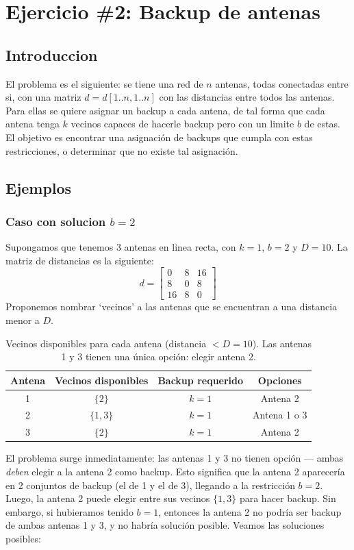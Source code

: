 \section{Ejercicio \#2: Backup de antenas}
\subsection{Introduccion}
El problema es el siguiente: se tiene una red de $n$ antenas, todas conectadas entre si, con una matriz $d = d[1..n, 1..n]$ con las distancias entre todos las antenas. Para ellas se quiere asignar un backup a cada antena, de tal forma que cada antena tenga $k$ vecinos capaces de hacerle backup pero con un limite $b$ de estas. El objetivo es encontrar una asignación de backups que cumpla con estas restricciones, o determinar que no existe tal asignación.

\subsection{Ejemplos}
\subsubsection{Caso con solucion $b=2$}
Supongamos que tenemos 3 antenas en linea recta, con $k=1$, $b=2$ y $D=10$. La matriz de distancias es la siguiente:
\[ d = \begin{bmatrix}
0 & 8 & 16 \\
8 & 0 & 8 \\
16 & 8 & 0
\end{bmatrix} \]
Proponemos nombrar `vecinos' a las antenas que se encuentran a una distancia menor a $D$.

\begin{table}[h]
\centering
\begin{tabular}{|c|c|c|c|}
\hline
\textbf{Antena} & \textbf{Vecinos disponibles} & \textbf{Backup requerido} & \textbf{Opciones} \\
\hline
1 & $\{2\}$ & $k=1$ & Antena 2 \\
\hline
2 & $\{1, 3\}$ & $k=1$ & Antena 1 o 3 \\
\hline
3 & $\{2\}$ & $k=1$ & Antena 2 \\
\hline
\end{tabular}
\caption{Vecinos disponibles para cada antena (distancia $< D=10$). Las antenas 1 y 3 tienen una única opción: elegir antena 2.}
\label{tab:ejemplo_vecinos}
\end{table}

El problema surge inmediatamente: las antenas 1 y 3 no tienen opción --- ambas \textit{deben} elegir a la antena 2 como backup. Esto significa que la antena 2 aparecería en 2 conjuntos de backup (el de 1 y el de 3), llegando a la restricción $b=2$. Luego, la antena 2 puede elegir entre sus vecinos $\{1, 3\}$ para hacer backup.
Sin embargo, si hubieramos tenido $b=1$, entonces la antena 2 no podría ser backup de ambas antenas 1 y 3, y no habría solución posible.
Veamos las soluciones posibles:

